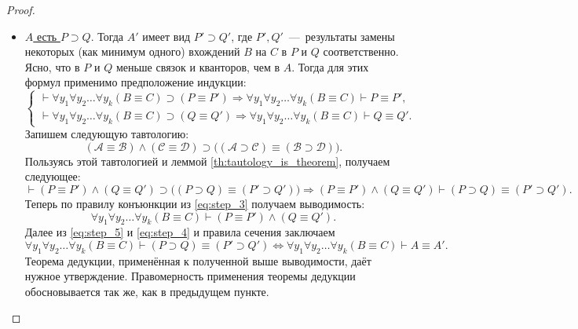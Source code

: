 \begin{proof}
\begin{itemize}
        \item \underline{$A$ есть $P \supset Q$}. Тогда $A'$ имеет вид $P' \supset Q'$, где $P', Q'$~---~результаты замены некоторых (как минимум одного) вхождений $B$ на $C$ в $P$ и $Q$ соответственно. Ясно, что в $P$ и $Q$ меньше связок и кванторов, чем в $A$. Тогда для этих формул применимо предположение индукции:
        \begin{equation}\label{eq:step_3}
            \begin{cases}
                \vdash \forall y_1\forall y_2\dots\forall y_k(B \equiv C) \supset (P \equiv P') \Longrightarrow \forall y_1\forall y_2\dots\forall y_k(B \equiv C) \vdash P \equiv P', \\
                \vdash \forall y_1\forall y_2\dots\forall y_k(B \equiv C) \supset (Q \equiv Q') \Longrightarrow \forall y_1\forall y_2\dots\forall y_k(B \equiv C) \vdash Q \equiv Q'.
            \end{cases}
        \end{equation}
        Запишем следующую тавтологию:
        \[
            (\mathcal{A} \equiv \mathcal{B}) \land (\mathcal{C} \equiv \mathcal{D}) \supset \big((\mathcal{A} \supset \mathcal{C}) \equiv (\mathcal{B} \supset \mathcal{D})\big).
        \]
        Пользуясь этой тавтологией и леммой \ref{th:tautology_is_theorem}, получаем следующее:
        \begin{equation}\label{eq:step_4}
            \vdash (P \equiv P') \land (Q \equiv Q') \supset \big((P \supset Q) \equiv (P' \supset Q')\big) \Longrightarrow (P \equiv P') \land (Q \equiv Q') \vdash (P \supset Q) \equiv (P' \supset Q').
        \end{equation}
        Теперь по правилу конъюнкции из \eqref{eq:step_3} получаем выводимость:
        \begin{equation}\label{eq:step_5}
            \forall y_1\forall y_2\dots\forall y_k(B \equiv C) \vdash (P \equiv P') \land (Q \equiv Q').
        \end{equation}
        Далее из \eqref{eq:step_5} и \eqref{eq:step_4} и правила сечения заключаем
        \[
            \forall y_1\forall y_2\dots\forall y_k(B \equiv C) \vdash (P \supset Q) \equiv (P' \supset Q') \Longleftrightarrow \forall y_1\forall y_2\dots\forall y_k(B \equiv C) \vdash A \equiv A'.
        \]
        Теорема дедукции, применённая к полученной выше выводимости, даёт нужное утверждение. Правомерность применения теоремы дедукции обосновывается так же, как в предыдущем пункте.


\end{itemize}
\end{proof}
